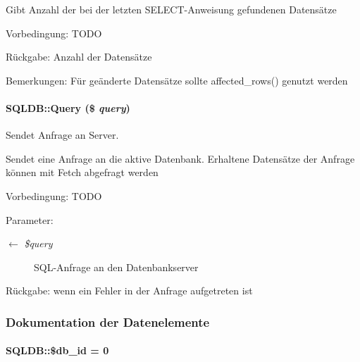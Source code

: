 Gibt Anzahl der bei der letzten SELECT-Anweisung gefundenen Datensätze \begin{Desc}
\item[Vorbedingung:]TODO \end{Desc}
\begin{Desc}
\item[R\"{u}ckgabe:]Anzahl der Datensätze \end{Desc}
\begin{Desc}
\item[Bemerkungen:]Für geänderte Datensätze sollte affected\_\-rows() genutzt werden \end{Desc}
\hypertarget{classSQLDB_fc6ffa8df50f68f07d9f5e3385b96d7a}{
\paragraph[Query]{\setlength{\rightskip}{0pt plus 5cm}SQLDB::Query (\$ {\em query})}\hfill}
\label{classSQLDB_fc6ffa8df50f68f07d9f5e3385b96d7a}


Sendet Anfrage an Server. 

Sendet eine Anfrage an die aktive Datenbank. Erhaltene Datensätze der Anfrage können mit Fetch abgefragt werden \begin{Desc}
\item[Vorbedingung:]TODO \end{Desc}
\begin{Desc}
\item[Parameter:]
\begin{description}
\item[\mbox{$\leftarrow$} {\em \$query}]SQL-Anfrage an den Datenbankserver \end{description}
\end{Desc}
\begin{Desc}
\item[R\"{u}ckgabe:]wenn ein Fehler in der Anfrage aufgetreten ist \end{Desc}


\subsubsection{Dokumentation der Datenelemente}
\hypertarget{classSQLDB_2c62843044a6ec53ad3384fb36aa811b}{
\paragraph[\$db\_\-id]{\setlength{\rightskip}{0pt plus 5cm}SQLDB::\$db\_\-id = 0}\hfill}
\label{classSQLDB_2c62843044a6ec53ad3384fb36aa811b}


